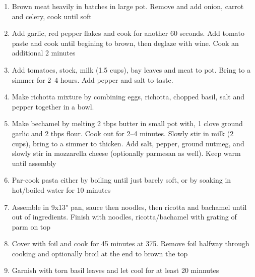 \documentclass[]{report}
\begin{document}
            {\begin{enumerate}    %
                  \item  Brown meat heavily in batches in large pot. Remove and add onion, carrot and celery, cook until soft 
                  \item Add garlic, red pepper flakes and cook for another 60 seconds. Add tomato paste and cook until begining to brown, then deglaze with wine. Cook an additional 2 minutes 
                  \item  Add tomatoes, stock, milk (1.5 cups), bay leaves and meat to pot. Bring to a simmer for 2--4 hours. Add pepper and salt to taste.
                  \item Make richotta mixture by combining eggs, richotta, chopped basil, salt and pepper together in a bowl. 
                  \item Make bechamel by melting 2 tbps butter in small pot with, 1 clove ground garlic and 2 tbps flour. Cook out for 2--4 minutes. Slowly stir in milk (2 cups), bring to a simmer to thicken. Add salt, pepper, ground nutmeg, and slowly stir in mozzarella cheese (optionally parmesan as well). Keep warm until assembly 
                  \item Par-cook pasta either by boiling until just barely soft, or by soaking in hot/boiled water for 10 minutes 
                  \item Assemble in 9x13" pan, sauce then noodles, then ricotta and bachamel until out of ingredients. Finish with noodles, ricotta/bachamel with grating of parm on top
                  \item Cover with foil and cook for 45 minutes at 375. Remove foil halfway through cooking and optionally broil at the end to brown the top 
                  \item Garnish with torn basil leaves and let cool for at least 20 minnutes  
            \end{enumerate}}
\end{document}
